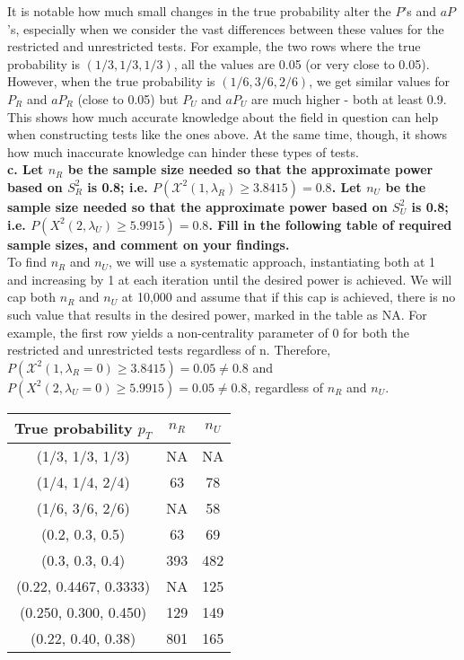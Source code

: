 \documentclass{article}
\begin{document}
It is notable how much small changes in the true probability alter the $P$'s and $aP$'s, especially when we consider the vast differences between these values for the restricted and unrestricted tests. For example, the two rows where the true probability is $(1/3, 1/3, 1/3)$, all the values are 0.05 (or very close to 0.05). However, when the true probability is $(1/6, 3/6, 2/6)$, we get similar values for $P_R$ and $aP_R$ (close to 0.05) but $P_U$ and $aP_U$ are much higher - both at least 0.9. This shows how much accurate knowledge about the field in question can help when constructing tests like the ones above. At the same time, though, it shows how much inaccurate knowledge can hinder these types of tests.
\\

\textbf{c. Let $n_R$ be the sample size needed so that the approximate power based on $S^2_R$ is 0.8; i.e. $P(\mathcal{X}^2(1, \lambda_R) \geq 3.8415) = 0.8$. Let $n_U$ be the sample size needed so that the approximate power based on $S^2_U$ is 0.8; i.e. $P(X^2(2, \lambda_U)\geq 5.9915) = 0.8$. Fill in the following table of required sample sizes, and comment on your findings.}\\

To find $n_R$ and $n_U$, we will use a systematic approach, instantiating both at 1 and increasing by 1 at each iteration until the desired power is achieved. We will cap both $n_R$ and $n_U$ at 10,000 and assume that if this cap is achieved, there is no such value that results in the desired power, marked in the table as NA. For example, the first row yields a non-centrality parameter of 0 for both the restricted and unrestricted tests regardless of n. Therefore, $P(\mathcal{X}^2(1, \lambda_R = 0) \geq 3.8415) = 0.05 \neq 0.8$ and $P(X^2(2, \lambda_U = 0)\geq 5.9915) = 0.05 \neq 0.8$, regardless of $n_R$ and $n_U$.\\

\begin{tabular}{ |c|c|c|  }
 \hline
 True probability $p_T$ & $n_R$ & $n_U$\\
 \hline
 (1/3, 1/3, 1/3) & NA & NA\\
 \hline
 (1/4, 1/4, 2/4) & 63 & 78\\
 \hline
 (1/6, 3/6, 2/6) & NA & 58\\
 \hline
 (0.2, 0.3, 0.5) & 63 & 69\\
 \hline
 (0.3, 0.3, 0.4) & 393 & 482\\
 \hline
 (0.22, 0.4467, 0.3333) & NA & 125\\
 \hline
 (0.250, 0.300, 0.450) & 129 & 149\\
 \hline
 (0.22, 0.40, 0.38) & 801 & 165\\
 \hline
\end{tabular}\\\\
\end{document}
